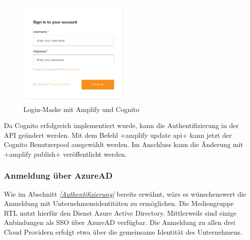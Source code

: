 \begin{figure}[htbp]
    \centering
    \includegraphics[width=0.5\textwidth]{50-Implementierung/Login.png}
    \caption{Login-Maske mit Amplify und Cognito}
    \label{fig:meine-grafik}
\end{figure}


Da Cognito erfolgreich implementiert wurde, kann die Authentifizierung in der API geändert werden.
Mit dem Befehl \spverb+amplify update api+ kann jetzt der Cognito Benutzerpool ausgewählt werden.
Im Anschluss kann die Änderung mit \spverb+amplify publish+ veröffentlicht werden.


\subsubsection{Anmeldung über AzureAD}

Wie im Abschnitt \textit{\ref{Authentifizierung} } bereits erwähnt, wäre es wünschenswert die Anmeldung mit Unternehmensidentitäten zu ermöglichen.
Die Mediengruppe RTL nutzt hierfür den Dienst Azure Active Directory.
Mittlerweile sind einige Anbindungen als SSO über AzureAD verfügbar.
Die Anmeldung zu allen drei Cloud Providern erfolgt etwa über die gemeinsame Identität des Unternehmens.

